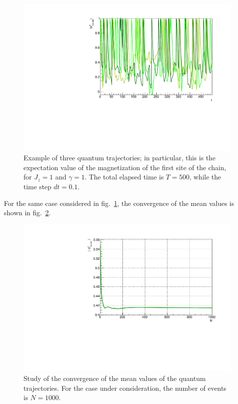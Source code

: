 \begin{figure}[H]
    \centering
    \includegraphics[scale=0.7]{Figures/QTrajectories3.pdf}
    \captionsetup{width=1.\linewidth}
    \caption{Example of three quantum trajectories; in particular, this is the expectation value of the magnetization of the first site of the chain, for $J_z = 1$ and $\gamma = 1$. The total elapsed time is $T=500$, while the time step $dt = 0.1$.}
    \label{fig:QTrajectories3}
\end{figure}

For the same case considered in fig.~\ref{fig:QTrajectories3}, the convergence of the mean values is shown in fig.~\ref{fig:Convergence_s8J1051}. 

\begin{figure}[H]
    \centering
    \includegraphics[scale=0.7]{Figures/Convergence_s8J1051.pdf}
    \captionsetup{width=1.\linewidth}
    \caption{Study of the convergence of the mean values of the quantum trajectories. For the case under consideration, the number of events is $N = 1000$.}
    \label{fig:Convergence_s8J1051}
\end{figure}

